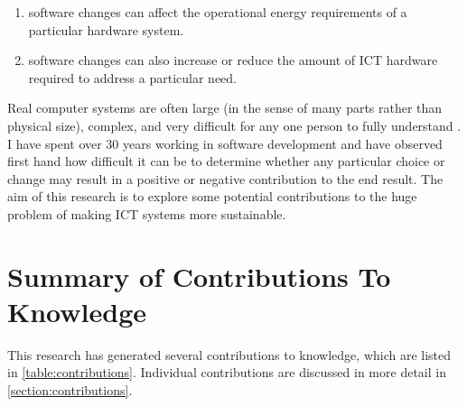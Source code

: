 \begin{enumerate}
\item software changes can affect the operational energy requirements of a particular hardware system.
\item software changes can also increase or reduce the amount of ICT hardware required to address a particular need.
\end{enumerate}

Real computer systems are often large (in the sense of many parts rather than physical size), complex, and very difficult for any one person to fully understand . I have spent over 30 years working in software development and have observed first hand how difficult it can be to determine whether any particular choice or change may result in a positive or negative contribution to the end result. The aim of this research is to explore some potential contributions to the huge problem of making ICT systems more sustainable.


\section{Summary of Contributions To Knowledge}
\label{section:contrib summary}

This research has generated several contributions to knowledge, which are listed in \autoref{table:contributions}. Individual contributions are discussed in more detail in \autoref{section:contributions}.

